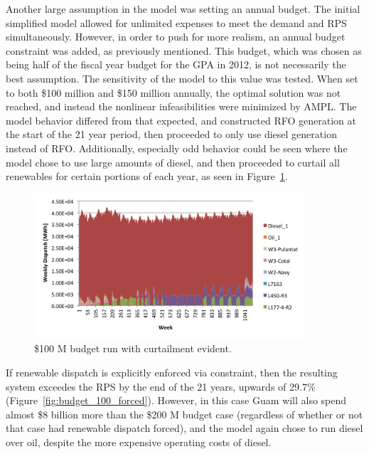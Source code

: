 \documentclass[12pt,letterpaper,fleqn]{article}
\begin{document}
Another large assumption in the model was setting an annual
budget. The initial simplified model allowed for unlimited expenses to
meet the demand and RPS simultaneously. However, in order to push for
more realism, an annual budget constraint was added, as previously
mentioned. This budget, which was chosen as being half of the fiscal
year budget for the GPA in 2012, is not necessarily the best
assumption. The sensitivity of the model to this value was
tested. When set to both \$100 million and \$150 million annually, the
optimal solution was not reached, and instead the nonlinear
infeasibilities were minimized by AMPL. The model behavior differed
from that expected, and constructed RFO generation at the start of the
21 year period, then proceeded to only use diesel generation instead
of RFO. Additionally, especially odd behavior could be seen where the
model chose to use large amounts of diesel, and then proceeded to
curtail all renewables for certain portions of each year, as seen in
Figure~\ref{fig:budget_100_not_forced}.

\begin{figure}[!h]
  \centering
  \includegraphics[width=0.9\textwidth]{img/budget_100_not_forced}
  \caption{\$100 M budget run with curtailment evident.}
  \label{fig:budget_100_not_forced}
\end{figure}

If renewable dispatch is explicitly enforced via constraint, then the
resulting system exceedes the RPS by the end of the 21 years,
upwards of 29.7\% (Figure~\ref{fig:budget_100_forced}). 
However, in this case Guam will also spend almost
\$8 billion more than the \$200 M budget case (regardless of whether
or not that case had renewable dispatch forced), and the model again
chose to run diesel over oil, despite the more expensive operating
costs of diesel.
\end{document}
